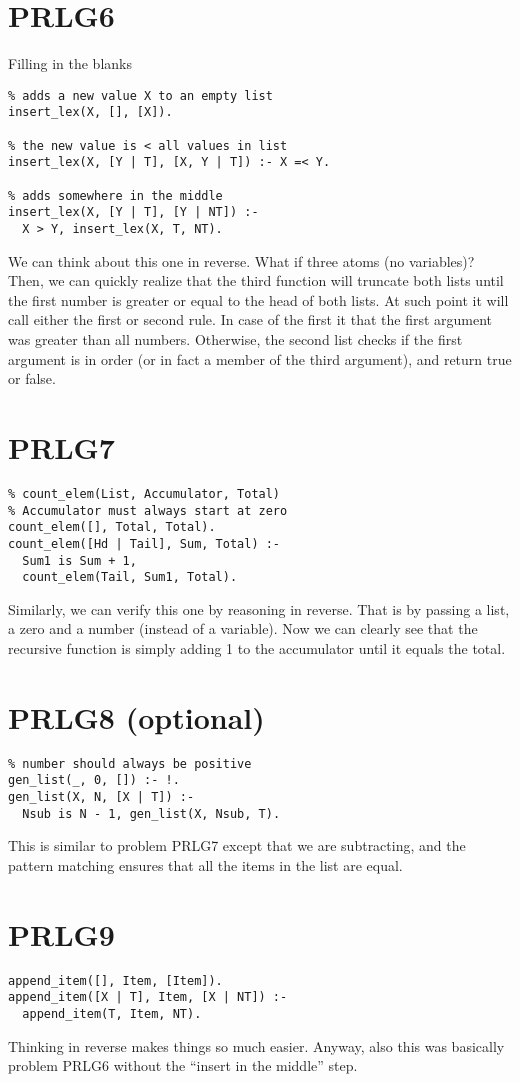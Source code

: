 \section*{PRLG6}
Filling in the blanks
\begin{verbatim}
% adds a new value X to an empty list
insert_lex(X, [], [X]).

% the new value is < all values in list
insert_lex(X, [Y | T], [X, Y | T]) :- X =< Y.

% adds somewhere in the middle
insert_lex(X, [Y | T], [Y | NT]) :-
  X > Y, insert_lex(X, T, NT).
\end{verbatim}
\noindent
We can think about this one in reverse. What if three atoms (no
variables)? Then, we can quickly realize that the third function will
truncate both lists until the first number is greater or equal to the
head of both lists. At such point it will call either the first or
second rule. In case of the first it that the first argument was greater
than all numbers. Otherwise, the second list checks if the first
argument is in order (or in fact a member of the third argument), and
return true or false.

\section*{PRLG7}
\begin{verbatim}
% count_elem(List, Accumulator, Total)
% Accumulator must always start at zero
count_elem([], Total, Total).
count_elem([Hd | Tail], Sum, Total) :-
  Sum1 is Sum + 1,
  count_elem(Tail, Sum1, Total).
\end{verbatim}
\noindent
Similarly, we can verify this one by reasoning in reverse. That is by
passing a list, a zero and a number (instead of a variable). Now we can
clearly see that the recursive function is simply adding 1 to the
accumulator until it equals the total.

\section*{PRLG8 (optional)}
\begin{verbatim}
% number should always be positive
gen_list(_, 0, []) :- !.
gen_list(X, N, [X | T]) :-
  Nsub is N - 1, gen_list(X, Nsub, T).
\end{verbatim}
\noindent
This is similar to problem PRLG7 except that we are subtracting, and the
pattern matching ensures that all the items in the list are equal.

\section*{PRLG9}
\begin{verbatim}
append_item([], Item, [Item]).
append_item([X | T], Item, [X | NT]) :-
  append_item(T, Item, NT).
\end{verbatim}
\noindent
Thinking in reverse makes things so much easier. Anyway, also this was
basically problem PRLG6 without the ``insert in the middle'' step.
